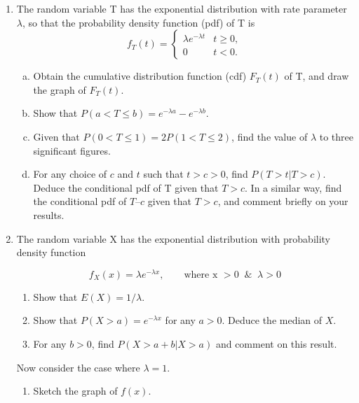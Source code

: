 \documentclass[a4paper,12pt]{article}
\begin{document}


\begin{enumerate}
\item The random variable T has the exponential distribution with rate parameter $\lambda$, so that the probability density function (pdf) of T is
$$ {\displaystyle f_{T}(t)={\begin{cases}\lambda e^{-\lambda t}&t\geq 0,\\0&t<0.\end{cases}}} $$
\begin{enumerate}[(a)]
\item Obtain the cumulative distribution function (cdf) $F_T(t)$ of T, and draw the graph of $F_T(t)$. 
\item Show that $P(a < T \leq b) = e^{-\lambda a} - e^{-\lambda b}$. 
\item Given that $P(0 < T \leq 1) = 2P(1 < T \leq 2)$, find the value of $\lambda$ to three significant figures. 
\item For any choice of $c$ and $t$ such that $t > c > 0$, find $P(T > t | T > c)$. 
Deduce the conditional pdf of T given that $T > c$. In a similar way, find the conditional pdf of $T – c$ given that $T > c$, and comment briefly on your results. 
\end{enumerate}

\item 
The random variable X has the exponential distribution with probability density function

$$ f_{X}(x) = \lambda e^{-\lambda x}, \qquad \mbox{where x } >0 \;\; \& \;\; \lambda >0 $$
\begin{enumerate}
\item Show that $E(X) = 1/\lambda$.

\item Show that $P(X>a) = e^{-\lambda x}$ for any $a > 0$. Deduce the median of $X$.

\item For any $b > 0$, find $P(X>a+b|X>a)$ and comment on this result.

\end{enumerate}

Now consider the case where $\lambda = 1$.
\begin{enumerate}
\item Sketch the graph of $f(x)$.


\end{enumerate}
\end{enumerate}
\end{document}
